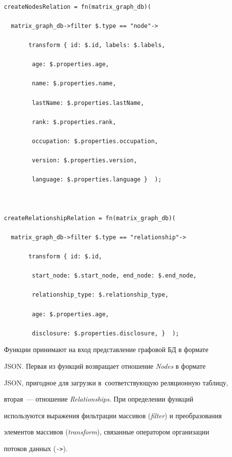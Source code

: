       \begin{verbatim}

createNodesRelation = fn(matrix_graph_db)(

  matrix_graph_db->filter $.type == "node"->

       transform { id: $.id, labels: $.labels,

        age: $.properties.age,

        name: $.properties.name,

        lastName: $.properties.lastName,

        rank: $.properties.rank,

        occupation: $.properties.occupation,

        version: $.properties.version,

        language: $.properties.language }  );



createRelationshipRelation = fn(matrix_graph_db)(

  matrix_graph_db->filter $.type == "relationship"->

       transform { id: $.id,

        start_node: $.start_node, end_node: $.end_node,

        relationship_type: $.relationship_type,

        age: $.properties.age,

        disclosure: $.properties.disclosure, }  );

\end{verbatim}



      Функции принимают на вход представление графовой БД в формате

JSON. Первая из функций возвращает отношение \textit{Nodes} в формате

JSON, пригодное для загрузки в~соответствующую реляционную таблицу,

вторая~--- отношение \textit{Relationships}. При определении функций

используются выражения фильтрации массивов (\textit{filter}) и преобразования

элементов массивов (\textit{transform}), связанные оператором организации

потоков данных (\verb"->").





\vspace*{-6pt}



